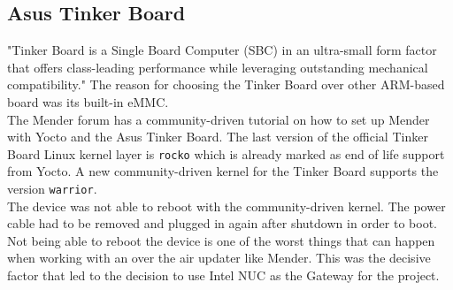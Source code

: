 \subsection{Asus Tinker Board}
"Tinker Board is a Single Board Computer (SBC) in an ultra-small form factor that offers class-leading performance while leveraging outstanding mechanical compatibility."\cite{asus-tinkerboard} The reason for choosing the Tinker Board over other ARM-based board was its built-in eMMC.\\
The Mender forum has a community-driven tutorial on how to set up Mender with Yocto and the Asus Tinker Board.\cite{asus-mender-yocto} The last version of the official Tinker Board Linux kernel layer is \verb|rocko| which is already marked as end of life support from Yocto. A new community-driven kernel for the Tinker Board supports the version \verb|warrior|. \cite{github-meta-rockchip} \\
The device was not able to reboot with the community-driven kernel. The power cable had to be removed and plugged in again after shutdown in order to boot. Not being able to reboot the device is one of the worst things that can happen when working with an over the air updater like Mender. This was the decisive factor that led to the decision to use Intel NUC as the Gateway for the project.

